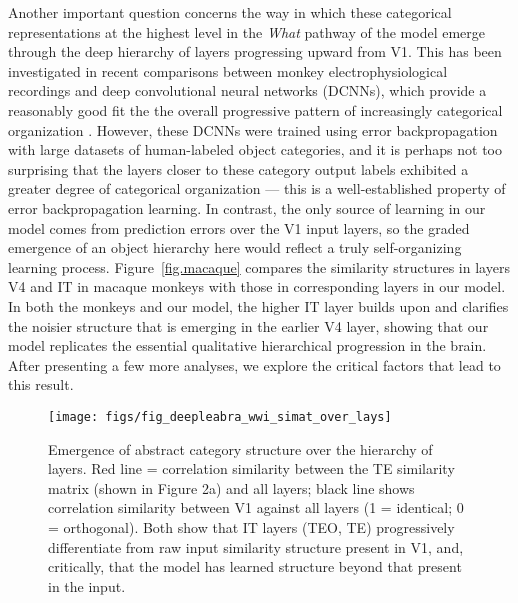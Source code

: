 \documentclass[11pt,twoside]{article}
\newif\myifpdf
\begin{document}
Another important question concerns the way in which these categorical representations at the highest level in the \emph{What} pathway of the model emerge through the deep hierarchy of layers progressing upward from V1.  This has been investigated in recent comparisons between monkey electrophysiological recordings and deep convolutional neural networks (DCNNs), which provide a reasonably good fit the the overall progressive pattern of increasingly categorical organization \cite{CadieuHongYaminsEtAl14}.  However, these DCNNs were trained using error backpropagation with large datasets of human-labeled object categories, and it is perhaps not too surprising that the layers closer to these category output labels exhibited a greater degree of categorical organization --- this is a well-established property of error backpropagation learning.  In contrast, the only source of learning in our model comes from prediction errors over the V1 input layers, so the graded emergence of an object hierarchy here would reflect a truly self-organizing learning process.  Figure~\ref{fig.macaque} compares the similarity structures in layers V4 and IT in macaque monkeys \cite{CadieuHongYaminsEtAl14} with those in corresponding layers in our model.  In both the monkeys and our model, the higher IT layer builds upon and clarifies the noisier structure that is emerging in the earlier V4 layer, showing that our model replicates the essential qualitative hierarchical progression in the brain.  After presenting a few more analyses, we explore the critical factors that lead to this result.

\begin{figure}
  \centering\texttt{[image: figs/fig\_deepleabra\_wwi\_simat\_over\_lays]}
  \caption{Emergence of abstract category structure over the hierarchy of layers.  Red line = correlation similarity between the TE similarity matrix (shown in Figure 2a) and all layers; black line shows correlation similarity between V1 against all layers (1 = identical; 0 = orthogonal). Both show that IT layers (TEO, TE) progressively differentiate from raw input similarity structure present in V1, and, critically, that the model has learned structure beyond that present in the input.}
  \label{fig.simat-lays}
\end{figure}
\end{document}
